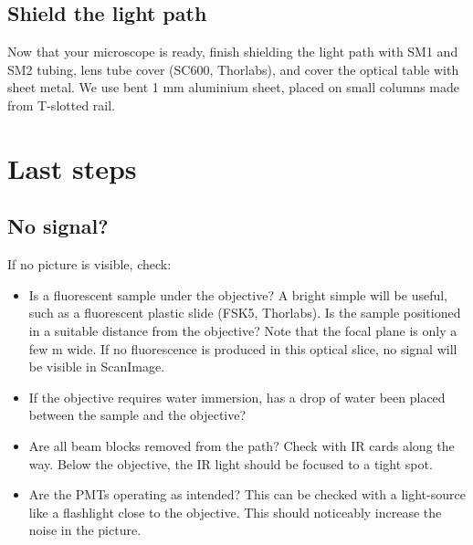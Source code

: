 \documentclass[10pt,letterpaper]{article}
\begin{document}
\subsection{Shield the light path}
Now that your microscope is ready, finish shielding the light path with SM1 and SM2 tubing, lens tube cover (SC600, Thorlabs), and cover the optical table with sheet metal. We use bent 1 mm aluminium sheet, placed on small columns made from T-slotted rail.

\section{Last steps}
%
\subsection{No signal?}
If no picture is visible, check:
\begin{itemize}
    \item Is a fluorescent sample under the objective? A bright simple will be useful, such as a fluorescent plastic slide (FSK5, Thorlabs). Is the sample positioned in a suitable distance from the objective? Note that the focal plane is only a few \textmu m wide. If no fluorescence is produced in this optical slice, no signal will be visible in ScanImage.
    \item If the objective requires water immersion, has a drop of water been placed between the sample and the objective?
    \item Are all beam blocks removed from the path? Check with IR cards along the way. Below the objective, the IR light should be focused to a tight spot.
    \item Are the PMTs operating as intended? This can be checked with a light-source like a flashlight close to the objective. This should noticeably increase the noise in the picture.
\end{itemize}
%
\end{document}
